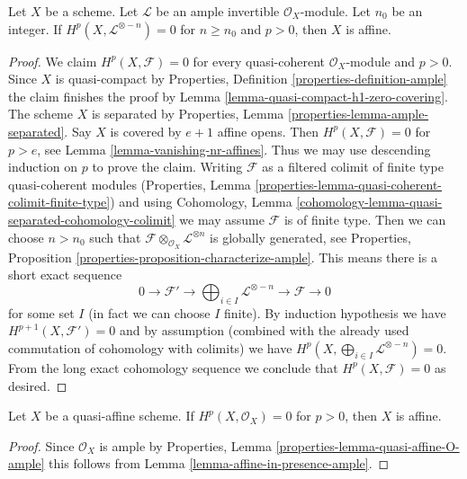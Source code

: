 \begin{lemma}
\label{lemma-affine-in-presence-ample}
Let $X$ be a scheme. Let $\mathcal{L}$ be an ample invertible
$\mathcal{O}_X$-module. Let $n_0$ be an integer.
If $H^p(X, \mathcal{L}^{\otimes -n}) = 0$ for $n \geq n_0$ and $p > 0$,
then $X$ is affine.
\end{lemma}

\begin{proof}
We claim $H^p(X, \mathcal{F}) = 0$ for every quasi-coherent
$\mathcal{O}_X$-module and $p > 0$. Since $X$ is quasi-compact
by Properties, Definition \ref{properties-definition-ample}
the claim finishes the proof
by Lemma \ref{lemma-quasi-compact-h1-zero-covering}.
The scheme $X$ is separated by
Properties, Lemma \ref{properties-lemma-ample-separated}.
Say $X$ is covered by $e + 1$ affine opens. Then
$H^p(X, \mathcal{F}) = 0$ for $p > e$, see
Lemma \ref{lemma-vanishing-nr-affines}. Thus we may use descending
induction on $p$ to prove the claim. Writing $\mathcal{F}$
as a filtered colimit of finite type quasi-coherent
modules (Properties, Lemma
\ref{properties-lemma-quasi-coherent-colimit-finite-type})
and using Cohomology, Lemma
\ref{cohomology-lemma-quasi-separated-cohomology-colimit}
we may assume $\mathcal{F}$ is of finite type.
Then we can choose $n > n_0$ such that
$\mathcal{F} \otimes_{\mathcal{O}_X} \mathcal{L}^{\otimes n}$
is globally generated, see Properties, Proposition
\ref{properties-proposition-characterize-ample}.
This means there is a short exact sequence
$$
0 \to \mathcal{F}' \to
\bigoplus\nolimits_{i \in I} \mathcal{L}^{\otimes -n}
\to \mathcal{F} \to 0
$$
for some set $I$ (in fact we can choose $I$ finite). By
induction hypothesis we have $H^{p + 1}(X, \mathcal{F}') = 0$
and by assumption (combined with the already used
commutation of cohomology with colimits)
we have $H^p(X, \bigoplus_{i \in I} \mathcal{L}^{\otimes -n}) = 0$.
From the long exact cohomology sequence we conclude that
$H^p(X, \mathcal{F}) = 0$ as desired.
\end{proof}

\begin{lemma}
\label{lemma-affine-if-quasi-affine}
Let $X$ be a quasi-affine scheme.
If $H^p(X, \mathcal{O}_X) = 0$ for $p > 0$,
then $X$ is affine.
\end{lemma}

\begin{proof}
Since $\mathcal{O}_X$ is ample by
Properties, Lemma \ref{properties-lemma-quasi-affine-O-ample}
this follows from Lemma \ref{lemma-affine-in-presence-ample}.
\end{proof}







